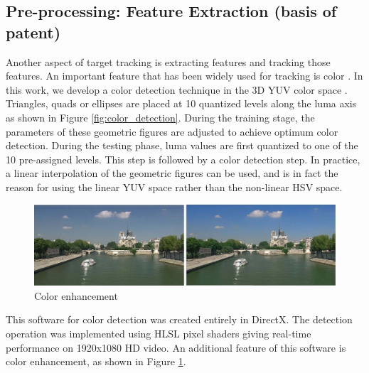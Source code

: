 \documentclass[12pt,letterpaper,doublespaced,ETD,proposal]{gt-ece-thesis}
\begin{document}
\begin{Body}
\subsection{Pre-processing: Feature Extraction (basis of patent)}
Another aspect of target tracking is extracting features and tracking those features.  An important feature that has been widely used for tracking is color \cite{1997_CNF_ColorHeadTracking_Fieguth, 1998_CNF_HeadTracking_Birchfield, 2000_JNL_PersonTracking_Darrell, 2002_JNL_MeanShift_Comaniciu, 2002_CNF_TRKcolor_Perez}.  In this work, we develop a color detection technique in the 3D YUV color space \cite{2008_TECH_3DvideoColorEnhancement_Aslam}.  Triangles, quads or ellipses are placed at 10 quantized levels along the luma axis as shown in Figure \ref{fig:color_detection}.  During the training stage, the parameters of these geometric figures are adjusted to achieve optimum color detection.  During the testing phase, luma values are first quantized to one of the 10 pre-assigned levels.  This step is followed by a color detection step.  In practice, a linear interpolation of the geometric figures can be used, and is in fact the reason for using the linear YUV space rather than the non-linear HSV space.

			
			\begin{figure}		
					\centering		
					\includegraphics[width=1.0\textwidth]{figs/Proposal_fig15_TRK_colorEnhancement}
					\caption{Color enhancement}
					\label{fig:color_enhancement}
			\end{figure}

This software for color detection was created entirely in DirectX.  The detection operation was implemented using HLSL pixel shaders giving real-time performance on 1920x1080 HD video.  An additional feature of this software is color enhancement, as shown in Figure \ref{fig:color_enhancement}.


\end{Body}
\end{document}
